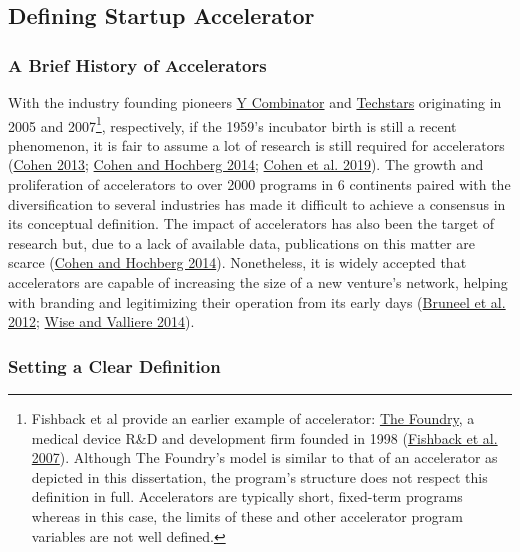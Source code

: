 \documentclass[
  12pt,
]{article}
\begin{document}
\hypertarget{defining-startup-accelerator}{%
\subsection{Defining Startup Accelerator}\label{defining-startup-accelerator}}

\hypertarget{a-brief-history-of-accelerators}{%
\subsubsection{A Brief History of Accelerators}\label{a-brief-history-of-accelerators}}

With the industry founding pioneers \href{https://www.ycombinator.com}{Y Combinator} and \href{https://www.techstars.com}{Techstars} originating in 2005 and 2007\footnote{Fishback et al provide an earlier example of accelerator: \href{https://thefoundry.com}{The Foundry}, a medical device R\&D and development firm founded in 1998 (\protect\hyperlink{ref-fishback_finding_2007}{Fishback et al. 2007}). Although The Foundry's model is similar to that of an accelerator as depicted in this dissertation, the program's structure does not respect this definition in full. Accelerators are typically short, fixed-term programs whereas in this case, the limits of these and other accelerator program variables are not well defined.}, respectively, if the 1959's incubator birth is still a recent phenomenon, it is fair to assume a lot of research is still required for accelerators (\protect\hyperlink{ref-cohen_how_2013}{Cohen 2013}; \protect\hyperlink{ref-cohen_accelerating_2014}{Cohen and Hochberg 2014}; \protect\hyperlink{ref-cohen_design_2019}{Cohen et al. 2019}). The growth and proliferation of accelerators to over 2000 programs in 6 continents paired with the diversification to several industries has made it difficult to achieve a consensus in its conceptual definition. The impact of accelerators has also been the target of research but, due to a lack of available data, publications on this matter are scarce (\protect\hyperlink{ref-cohen_accelerating_2014}{Cohen and Hochberg 2014}). Nonetheless, it is widely accepted that accelerators are capable of increasing the size of a new venture's network, helping with branding and legitimizing their operation from its early days (\protect\hyperlink{ref-bruneel_evolution_2012}{Bruneel et al. 2012}; \protect\hyperlink{ref-wise_impact_2014}{Wise and Valliere 2014}).

\hypertarget{setting-a-clear-definition}{%
\subsubsection{Setting a Clear Definition}\label{setting-a-clear-definition}}
\end{document}
